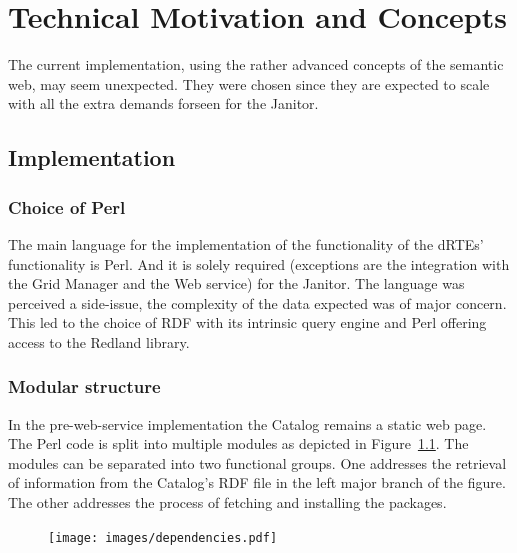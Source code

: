 \chapter{Technical Motivation and Concepts}

The current implementation, using the rather advanced concepts of the
semantic web, may seem unexpected. They were chosen since they are expected
to scale with all the extra demands forseen for the Janitor.

\section{Implementation}

\subsection{Choice of Perl}

The main language for the implementation of the functionality of the
dRTEs' functionality is Perl. And it is solely required (exceptions
are the integration with the Grid Manager and the Web service) for the
Janitor.
The language was perceived a side-issue, the complexity of the data
expected was of major concern. This led to the choice of RDF with its
intrinsic query engine and Perl offering access to the Redland library.

\subsection{Modular structure}

In the pre-web-service implementation the Catalog remains a static
web page. The Perl code is split into multiple modules as depicted
in Figure~\ref{fig:janitorDependencies}.  The modules can be separated
into two functional groups. One addresses the retrieval of information
from the Catalog's RDF file in the left major branch of the figure. The
other addresses the process of fetching and installing the packages.

\begin{landscape}
 \begin{figure}[!h]
 \vspace{4cm}
 \begin{center} 
 \texttt{[image: images/dependencies.pdf]}
 \end{center} 
 \vfill
 \label{fig:janitorDependencies} 
 \end{figure}
\end{landscape}

